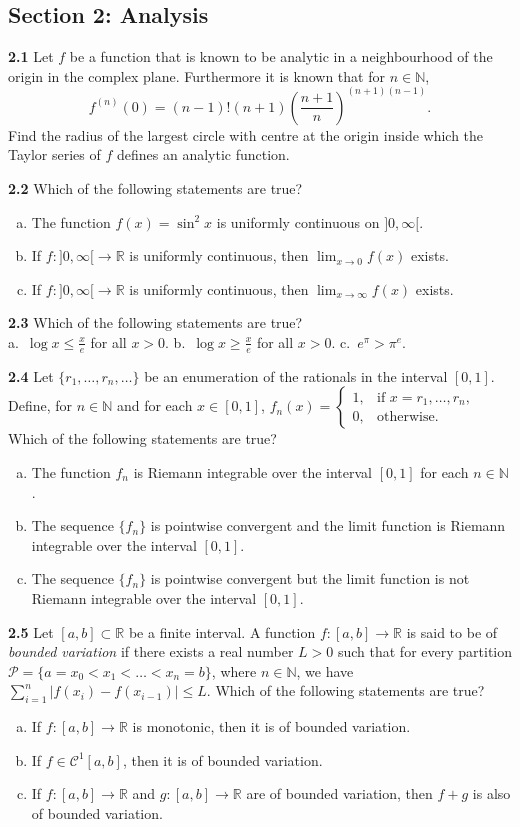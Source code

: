 \documentclass[11pt,a4paper]{article}
\newcommand{\N}{\mathbb{N}}
\newcommand{\R}{\mathbb{R}}
\newcommand{\examsec}[1]{%
  \subsection*{#1}
  \vspace{-2pt}
}
\newcommand{\qitem}[1]{\par\medskip\noindent\textbf{#1}\hspace{0.5em}}
\begin{document}
\examsec{Section 2: Analysis}

\qitem{2.1} Let $f$ be a function that is known to be analytic in a neighbourhood of the origin in the complex plane. Furthermore it is known that for $n \in \N$,
\[
  f^{(n)}(0) = (n - 1)!(n + 1)\left(\frac{n + 1}{n}\right)^{(n+1)(n-1)}.
\]
Find the radius of the largest circle with centre at the origin inside which the Taylor series of $f$ defines an analytic function.

\qitem{2.2} Which of the following statements are true?
\begin{enumerate}[a.]
  \item The function $f(x) = \sin^2 x$ is uniformly continuous on $]0, \infty[$.
  \item If $f : ]0, \infty[ \to \R$ is uniformly continuous, then $\lim_{x \to 0} f(x)$ exists.
  \item If $f : ]0, \infty[ \to \R$ is uniformly continuous, then $\lim_{x \to \infty} f(x)$ exists.
\end{enumerate}

\qitem{2.3} Which of the following statements are true?\\
a.\ $\log x \le \frac{x}{e}$ for all $x > 0$. \qquad b.\ $\log x \ge \frac{x}{e}$ for all $x > 0$. \qquad c.\ $e^\pi > \pi^e$.

\qitem{2.4} Let $\{r_1, \dots, r_n, \dots\}$ be an enumeration of the rationals in the interval $[0, 1]$. Define, for $n \in \N$ and for each $x \in [0, 1]$, $f_n(x) = \begin{cases} 1, & \text{if } x = r_1, \dots, r_n, \\ 0, & \text{otherwise.} \end{cases}$ Which of the following statements are true?
\begin{enumerate}[a.]
  \item The function $f_n$ is Riemann integrable over the interval $[0, 1]$ for each $n \in \N$.
  \item The sequence $\{f_n\}$ is pointwise convergent and the limit function is Riemann integrable over the interval $[0, 1]$.
  \item The sequence $\{f_n\}$ is pointwise convergent but the limit function is not Riemann integrable over the interval $[0, 1]$.
\end{enumerate}

\qitem{2.5} Let $[a, b] \subset \R$ be a finite interval. A function $f : [a, b] \to \R$ is said to be of \emph{bounded variation} if there exists a real number $L > 0$ such that for every partition $\mathcal{P} = \{a = x_0 < x_1 < \dots < x_n = b\}$, where $n \in \N$, we have $\sum_{i=1}^{n} |f(x_i) - f(x_{i-1})| \le L$. Which of the following statements are true?
\begin{enumerate}[a.]
  \item If $f : [a, b] \to \R$ is monotonic, then it is of bounded variation.
  \item If $f \in \mathcal{C}^1[a, b]$, then it is of bounded variation.
  \item If $f : [a, b] \to \R$ and $g : [a, b] \to \R$ are of bounded variation, then $f + g$ is also of bounded variation.
\end{enumerate}
\end{document}
